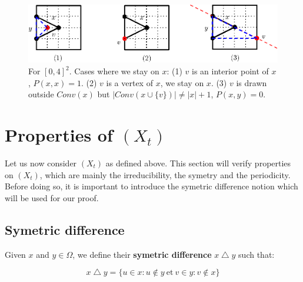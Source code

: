 \documentclass[11pt]{article}
\begin{document}
\begin{figure}
  \begin{center}
    \includegraphics[scale=0.9]{assets/boucle}
    \caption{For $[0,4]^2$. Cases where we stay on $x$: (1) $v$ is an interior point of $x$, $P(x,x) = 1$. (2) $v$ is a vertex of $x$, we stay on $x$. (3) $v$ is drawn outside $Conv(x)$ but $|Conv(x\cup\{v\})| \neq |x|+1$, $P(x,y) = 0$. }
    \label{fig:boucle}
  \end{center}
\end{figure}

\section{Properties of $(X_t)$}

Let us now consider $(X_t)$ as defined above. This section will verify properties on $(X_t)$, which are mainly the irreducibility, the symetry and the periodicity. Before doing so, it is important to introduce the symetric difference notion which will be used for our proof.

\subsection{Symetric difference}

Given $x$ and $y \in \Omega$, we define their \textbf{symetric difference} $x \bigtriangleup y$ such that:

\begin{equation}
  x \bigtriangleup y = \{ u \in x : u \notin y \ \mbox{et} \ v \in y : v \notin x \}
\end{equation}

%
\end{document}
